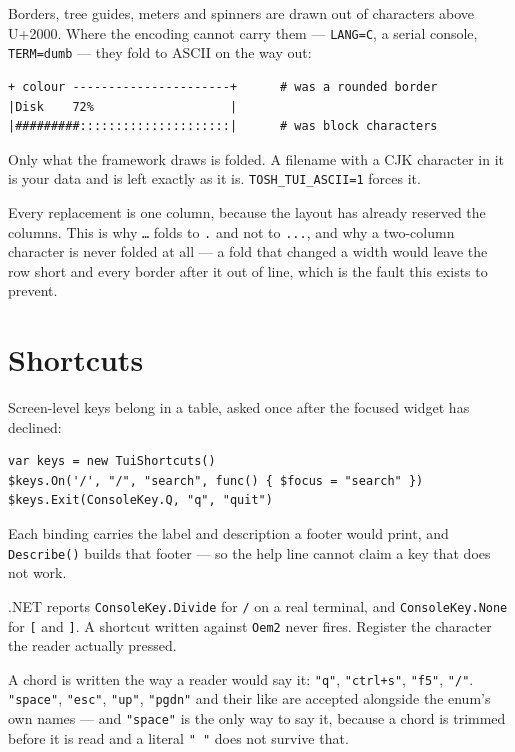 \documentclass[11pt,a4paper,twoside,openany]{book}
\newcommand{\code}[1]{\texttt{\small #1}}
\begin{document}
Borders, tree guides, meters and spinners are drawn out of characters above U+2000.
Where the encoding cannot carry them --- \code{LANG=C}, a serial console, \code{TERM=dumb}
--- they fold to ASCII on the way out:

\begin{verbatim}
+ colour ----------------------+      # was a rounded border
|Disk    72%                   |
|#########:::::::::::::::::::::|      # was block characters
\end{verbatim}

\noindent Only what the framework draws is folded. A filename with a CJK character in
it is your data and is left exactly as it is. \code{TOSH\_TUI\_ASCII=1} forces it.

\begin{warnbox}
Every replacement is one column, because the layout has already reserved the columns.
This is why \code{…} folds to \code{.} and not to \code{...}, and why a two-column
character is never folded at all --- a fold that changed a width would leave the row
short and every border after it out of line, which is the fault this exists to prevent.
\end{warnbox}

\section{Shortcuts}

Screen-level keys belong in a table, asked once after the focused widget has
declined:

\begin{lstlisting}
var keys = new TuiShortcuts()
$keys.On('/', "/", "search", func() { $focus = "search" })
$keys.Exit(ConsoleKey.Q, "q", "quit")
\end{lstlisting}

Each binding carries the label and description a footer would print, and
\code{Describe()} builds that footer --- so the help line cannot claim a key that
does not work.

\begin{warnbox}
.NET reports \code{ConsoleKey.Divide} for \code{/} on a real terminal, and
\code{ConsoleKey.None} for \code{[} and \code{]}. A shortcut written against
\code{Oem2} never fires. Register the character the reader actually pressed.
\end{warnbox}

A chord is written the way a reader would say it: \code{"q"}, \code{"ctrl+s"},
\code{"f5"}, \code{"/"}. \code{"space"}, \code{"esc"}, \code{"up"}, \code{"pgdn"}
and their like are accepted alongside the enum's own names --- and \code{"space"} is
the only way to say it, because a chord is trimmed before it is read and a literal
\code{" "} does not survive that.
\end{document}
